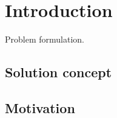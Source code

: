 \section*{Introduction}
\par Problem formulation.


\subsection{Solution concept}


\begin{comment}
	\begin{enumerate}[label=\roman*]
		\item List item 0;
		\item List item 1;
	\end{enumerate}
\end{comment}

\subsection{Motivation}
\clearpage